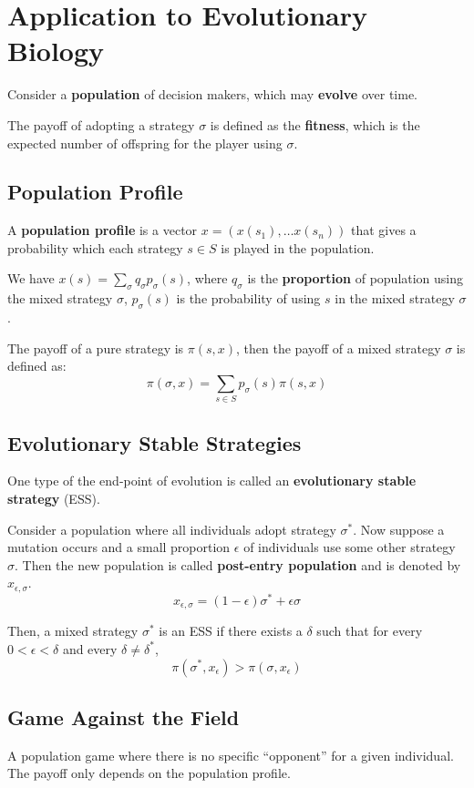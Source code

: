 \documentclass[11pt,a4paper]{article}
\begin{document}
\section{Application to Evolutionary Biology}
Consider a \textbf{population} of decision makers, which may \textbf{evolve} over time. \par
The payoff of adopting a strategy $\sigma$ is defined as the \textbf{fitness}, which is the expected number of offspring for the player using $\sigma$. \par

\subsection{Population Profile}
A \textbf{population profile} is a vector $x = (x(s_1), \dots x(s_n))$ that gives a probability which each strategy $s \in S$ is played in the population. \par
We have $x(s) = \sum_{\sigma} q_{\sigma} p_{\sigma} (s)$, where $q_{\sigma}$ is the \textbf{proportion} of population using the mixed strategy $\sigma$, $p_{\sigma} (s)$ is the probability of using $s$ in the mixed strategy $\sigma$. \par
The payoff of a pure strategy is $\pi(s, x)$, then the payoff of a mixed strategy $\sigma$ is defined as:
\[
\pi(\sigma, x) = \sum_{s \in S} p_{\sigma}(s) \pi(s, x)
\] 

\subsection{Evolutionary Stable Strategies}
One type of the end-point of evolution is called an \textbf{evolutionary stable strategy} (ESS). \par

Consider a population where all individuals adopt strategy $\sigma^*$. Now suppose a mutation occurs and a small proportion $\epsilon$ of individuals use some other strategy $\sigma$. Then the new population is called \textbf{post-entry population} and is denoted by $x_{\epsilon, \sigma}$.
\[
x_{\epsilon, \sigma} = (1 - \epsilon) \sigma^* + \epsilon \sigma
\]

Then, a mixed strategy $\sigma^*$ is an ESS if there exists a $\delta$ such that for every $0 < \epsilon < \delta$ and every $\delta \neq \delta^*$,
\[
\pi(\sigma^*, x_\epsilon) > \pi(\sigma, x_\epsilon)
\]

\subsection{Game Against the Field}
A population game where there is no specific ``opponent'' for a given individual. The payoff only depends on the population profile.
\end{document}
